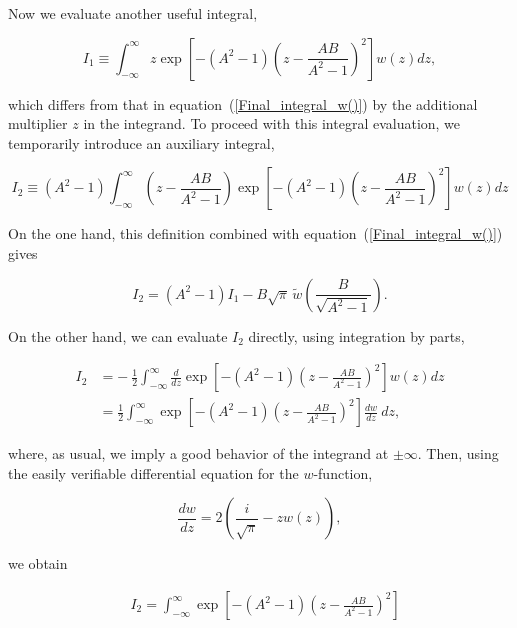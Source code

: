 \documentclass[draft]{agujournal2019}
\begin{document}
{Now we evaluate another useful integral,
\begin{linenomath*}
\begin{equation}
I_{1}\equiv\int_{-\infty}^{\infty}z\exp\left[  -(A^{2}-1)\left(  z-\frac
{AB}{A^{2}-1}\right)  ^{2}\right]w(z)dz, 
\label{I_1}
\end{equation}
\end{linenomath*}
which differs from that in equation~(\ref{Final_integral_w()}) by the additional multiplier $z$ in the integrand.
To proceed with this integral evaluation, we temporarily introduce an auxiliary
integral,
\begin{linenomath*}
\begin{equation*}
I_{2}\equiv(A^{2}-1)\int_{-\infty}^{\infty}\left(  z-\frac{AB}{A^{2}-1}\right)\exp\left[  -(A^{2}-1)\left(  z-\frac
{AB}{A^{2}-1}\right)  ^{2}\right]w(z)dz
\end{equation*}
\end{linenomath*}
On the one hand, this definition combined with
equation~(\ref{Final_integral_w()}) gives
\begin{linenomath*}
\begin{equation}
I_{2}=(A^{2}-1)I_{1}-B\sqrt{\pi}\,\tilde{w}\left(  \frac{B}{\sqrt{A^{2}-1}}\right)  .
\label{I_2_2}
\end{equation}
\end{linenomath*}
On the other hand, we can evaluate $I_{2}$ directly, using integration by
parts,
\begin{linenomath*}
\begin{align*}
I_{2}  &  =-\ \frac{1}{2}\int_{-\infty}^{\infty}\frac{d}{dz}\exp\left[
-(A^{2}-1)\left(  z-\frac{AB}{A^{2}-1}\right)  ^{2}\right]  w\left(  z\right)
dz\\
&  =\frac{1}{2}\int_{-\infty}^{\infty}\exp\left[  -(A^{2}-1)\left(
z-\frac{AB}{A^{2}-1}\right)  ^{2}\right]  \frac{dw}{dz}\ dz,
\end{align*}
\end{linenomath*}
where, as usual, we imply a good behavior of the integrand at $\pm\infty$.
Then, using the easily verifiable differential equation for the $w$-function,
\begin{linenomath*}
\[
\frac{dw}{dz}=2\left(  \frac{i}{\sqrt{\pi}}-zw\left(  z\right)  \right)  ,
\]
\end{linenomath*}
we obtain
\begin{linenomath*}
\begin{align}
&  I_{2}=\int_{-\infty}^{\infty}\exp\left[  -(A^{2}-1)\left(  z-\frac
{AB}{A^{2}-1}\right)  ^{2}\right] \nonumber\\

\end{align}
\end{linenomath*}}
\end{document}

